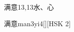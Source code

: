 \begin{entry}{满意}{13,13}{⽔、⼼}
  \begin{phonetics}{满意}{man3yi4}[][HSK 2]
  \end{phonetics}
\end{entry}
